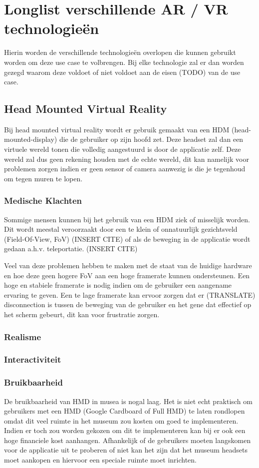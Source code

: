\chapter{Longlist verschillende AR / VR technologieën}
\label{ch:longlist}

Hierin worden de verschillende technologieën overlopen die kunnen gebruikt worden om deze use case te volbrengen.
Bij elke technologie zal er dan worden gezegd waarom deze voldoet of niet voldoet aan de eisen (TODO) van de use case.

\section{Head Mounted Virtual Reality}
Bij head mounted virtual reality wordt er gebruik gemaakt van een HDM (head-mounted-display) die de gebruiker op zijn hoofd zet. Deze headset zal dan een virtuele wereld tonen die volledig aangestuurd is door de applicatie zelf. Deze wereld zal dus geen rekening houden met de echte wereld, dit kan namelijk voor problemen zorgen indien er geen sensor of camera aanwezig is die je tegenhoud om tegen muren te lopen.
\subsection{Medische Klachten}
Sommige mensen kunnen bij het gebruik van een HDM ziek of misselijk worden. Dit wordt meestal veroorzaakt door een te klein of onnatuurlijk gezichtsveld (Field-Of-View, FoV) (INSERT CITE) of als de beweging in de applicatie wordt gedaan a.h.v. teleportatie. (INSERT CITE)

Veel van deze problemen hebben te maken met de staat van de huidige hardware en hoe deze geen hogere FoV aan een hoge framerate kunnen ondersteunen. Een hoge en stabiele framerate is nodig indien om de gebruiker een aangename ervaring te geven. Een te lage framerate kan ervoor zorgen dat er (TRANSLATE) disconnection is tussen de beweging van de gebruiker en het gene dat effectief op het scherm gebeurt, dit kan voor frustratie zorgen.
\subsection{Realisme}
\subsection{Interactiviteit}
\subsection{Bruikbaarheid}
De bruikbaarheid van HMD in musea is nogal laag. Het is niet echt praktisch om gebruikers met een HMD (Google Cardboard of Full HMD) te laten rondlopen omdat dit veel ruimte in het museum zou kosten om goed te implementeren. Indien er toch zou worden gekozen om dit te implementeren kan bij er ook een hoge financiele kost aanhangen. Afhankelijk of de gebruikers moeten langskomen voor de applicatie uit te proberen of niet kan het zijn dat het museum headsets moet aankopen en hiervoor een speciale ruimte moet inrichten.


